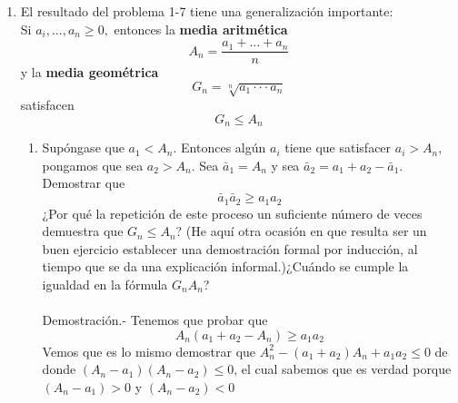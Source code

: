 \begin{enumerate}
       \item El resultado del problema 1-7 tiene una generalización importante:\\
          Si $a_i,...,a_n \geq 0,$ entonces la \textbf{media aritmética} 
          $$A_n=\dfrac{a_1+...+a_n}{n}$$
          y la \textbf{media geométrica}
          $$G_n=\sqrt[n]{a_1\cdot \cdot \cdot a_n}$$
          satisfacen
          $$G_n \leq A_n$$
          \begin{enumerate}[\bfseries (a)]
             \item Supóngase que $a_1<A_n.$ Entonces algún $a_i$ tiene que satisfacer $a_i>A_n$, pongamos que sea $a_2>A_n$. Sea $\bar{a}_1 = A_n$ y sea $\bar{a}_2=a_1+a_2 - \bar{a}_1$. Demostrar que $$\bar{a}_1 \bar{a}_2 \geq a_1 a_2$$ 
                ¿Por qué la repetición de este proceso un suficiente número de veces demuestra que $G_n \leq A_n$? (He aquí otra ocasión en que resulta ser un buen ejercicio establecer una demostración formal por inducción, al tiempo que se da una explicación informal.)¿Cuándo se cumple la igualdad en la fórmula $G_n A_n$?\\\\
		  Demostración.-\; Tenemos que probar que $$A_n (a_1+a_2-A_n)\geq a_1 a_2$$ 
		  Vemos que es lo mismo demostrar que $A_n^2 - (a_1 + a_2)A_n + a_1 a_2 \leq 0$ de donde $(A_n - a_1)(A_n-a_2)\leq 0$, el cual sabemos que es verdad porque $(A_n -a_1)>0$ y $(A_n - a_2)<0$\\\\


\end{enumerate}
\end{enumerate}
